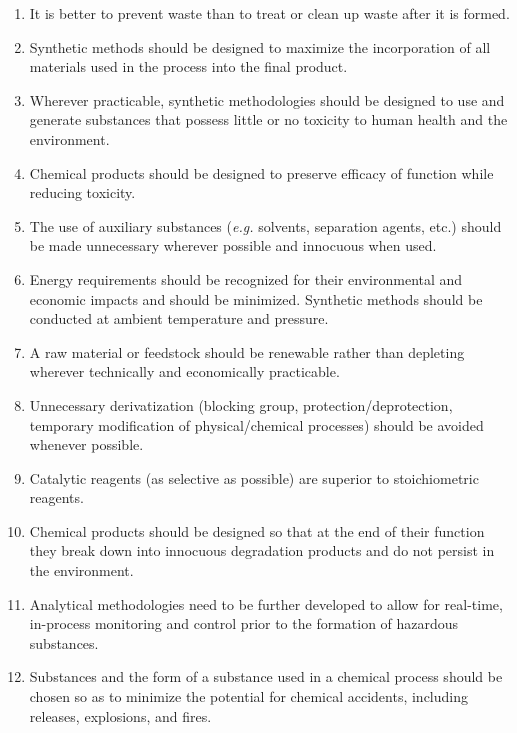 {\itshape
\begin{enumerate}
  \item It is better to prevent waste than to treat or clean up waste after it is formed.
  
  \item Synthetic methods should be designed to
  maximize the incorporation of all materials used in the process into the final
  product.
  
  \item Wherever practicable, synthetic methodologies should
  be designed to use and generate substances that possess little or no toxicity
  to human health and the environment.
  
  \item Chemical products should be designed to preserve
  efficacy of function while reducing toxicity.
  
  \item \label{itm:aux}The use of auxiliary substances (\textit{e.g.} solvents,
  separation agents, etc.) should be made unnecessary wherever possible and
  innocuous when used.
  
  \item Energy requirements should be recognized for their
  environmental and economic impacts and should be minimized. Synthetic methods
  should be conducted at ambient temperature and pressure.
  
  \item \label{itm:renewable}A raw material or feedstock should be renewable
  rather than depleting wherever technically and economically practicable.
  
  \item Unnecessary derivatization (blocking group,
  protection/deprotection, temporary modification of physical/chemical
  processes) should be avoided whenever possible.
  
  \item Catalytic reagents (as selective as possible) are
  superior to stoichiometric reagents.
  
  \item Chemical products should be designed so that at the end of their
  function they break down into innocuous degradation products and do not
  persist in the environment.
  
  \item Analytical methodologies need to be further developed to allow for
  real-time, in-process monitoring and control prior to the formation of
  hazardous substances.
  
  \item Substances and the form of a substance used in a chemical process should
  be chosen so as to minimize the potential for chemical accidents, including
  releases, explosions, and fires.

\end{enumerate}

} 

